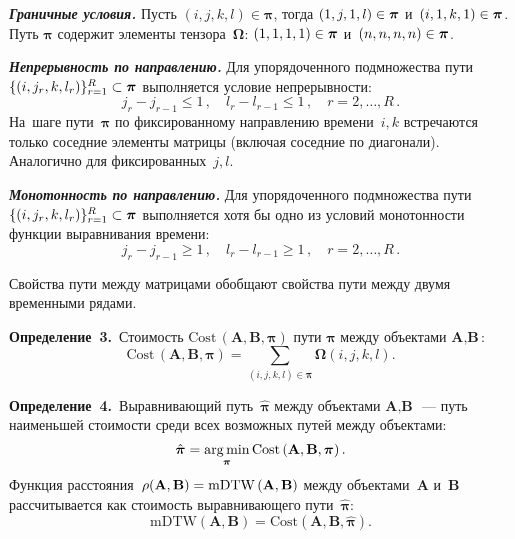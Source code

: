 \begin{multicols}{2}
{\bfseries\textit{Граничные условия.}}
 Пусть $(i,j,k,l) \in \boldsymbol{\pi}$, тогда $(1,j,1,l) \hm\in 
 \boldsymbol{\pi}$ и~$(i,1,k,1) \hm\in \boldsymbol{\pi}$.
Путь $\boldsymbol{\pi}$ содержит элементы тензора~$\boldsymbol{\Omega}$: 
$(1,1,1,1) \hm\in \boldsymbol{\pi}$ и~$(n,n,n,n) \hm\in \boldsymbol{\pi}$.

{\bfseries\textit{Непрерывность по направлению.}}
Для упорядоченного подмножества пути $\{(i,j_r,k,l_r)\}_{r=1}^{R}
\hm\subset\boldsymbol{\pi}$ выполняется условие непрерывности:
$$
j_{r}-j_{r-1}\leq1\,,\quad l_r-l_{r-1}\leq1\,, \quad r = 2,\ldots,R\,.
$$
На~шаге пути~$\boldsymbol{\pi}$ по фиксированному направлению времени~$i,k$ 
встречаются только соседние элементы матрицы (включая соседние по диагонали). 
Аналогично для фиксированных~$j,l$.

{\bfseries\textit{Монотонность по направлению.}}
Для упорядоченного подмножества пути  $\{(i,j_r,k,l_r)\}_{r=1}^{R}
\hm\subset\boldsymbol{\pi}$ выполняется хотя бы одно из условий 
монотонности функции выравнивания времени: 
$$
j_{r}-j_{r-1}\geq1\,,\quad l_r-l_{r-1}\geq1\,, \quad r = 2,\ldots,R\,.
$$

Свойства пути между матрицами обобщают свойства пути между двумя 
временными рядами.

\smallskip

\noindent
\textbf{Определение~3.}\ {Стоимость 
$\mathrm{Cost}\,(\textbf{A},\textbf{B},{\boldsymbol{\pi}})$ пути $\boldsymbol{\pi}$ 
между объектами $\textbf{A}, \textbf{B}$:
\begin{equation*}
\mathrm{Cost}\,(\textbf{A},\textbf{B},{\boldsymbol{\pi}}) = 
\sum\limits_{(i,j,k,l) \in \boldsymbol{\pi}}{\boldsymbol{\Omega}}(i,j,k,l).
\end{equation*}}

\noindent
\textbf{Определение~4.}\ 
{Выравнивающий путь~$\hat{\boldsymbol{\pi}}$ между 
объектами $\textbf{A},\textbf{B}$~--- путь наименьшей стоимости 
среди всех возможных путей между объектами:
\begin{equation*}
\hat{\boldsymbol{\pi}} = 
\mathop{\mathrm{arg}\,\mathrm{min}}\limits_{{\boldsymbol{\pi}}} \mathrm{Cost}
\left(\textbf{A},\textbf{B},{\boldsymbol{\pi}}\right).
\end{equation*}}
Функция расстояния~$\rho (\textbf{A},\textbf{B})\hm = \mathrm{mDTW}\,
(\textbf{A},\textbf{B})$ между объектами~$\textbf{A}$ и~$\textbf{B}$ 
рассчитывается как стоимость выравнивающего пути~$\hat{\boldsymbol{\pi}}$:
\begin{equation}
\mathrm{mDTW}(\textbf{A},\textbf{B}) = \mathrm{Cost}\left(\textbf{A},
\textbf{B},\hat{\boldsymbol{\pi}}\right).
\end{equation}


\end{multicols}

